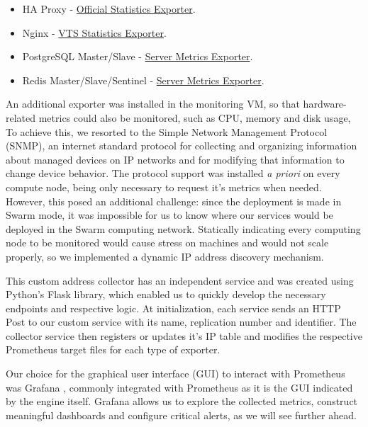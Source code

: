 \documentclass[12pt]{article}
\begin{document}
\vspace{-10pt}
\begin{itemize} [noitemsep]
  \item HA Proxy - \href{https://github.com/prometheus/haproxy_exporter}{Official Statistics Exporter}.
  \item Nginx - \href{https://github.com/hnlq715/nginx-vts-exporter}{VTS Statistics Exporter}.
  \item PostgreSQL Master/Slave - \href{https://github.com/wrouesnel/postgres_exporter}{Server Metrics Exporter}.
  \item Redis Master/Slave/Sentinel - \href{https://github.com/oliver006/redis_exporter}{Server Metrics Exporter}.
\end{itemize}
\vspace{-10pt}

An additional exporter was installed in the monitoring VM, so that hardware-related metrics could also be monitored, such as CPU, memory and disk usage, 
To achieve this, we resorted to the Simple Network Management Protocol (SNMP), an internet standard protocol for collecting and organizing information about 
managed devices on IP networks and for modifying that information to change device behavior. 
The protocol support was installed \textit{a priori} on every compute node, being only necessary to request it's metrics when needed. 
However, this posed an additional challenge: since the deployment is made in Swarm mode, it was impossible for us to know where our services would be deployed 
in the Swarm computing network. 
Statically indicating every computing node to be monitored would cause stress on machines and would not scale properly, so we implemented a dynamic IP address 
discovery mechanism.

This custom address collector has an independent service and was created using Python's Flask library, which enabled us to quickly develop the necessary endpoints 
and respective logic. 
At initialization, each service sends an HTTP Post to our custom service with its name, replication number and identifier. 
The collector service then registers or updates it's IP table and modifies the respective Prometheus target files for each type of exporter.

Our choice for the graphical user interface (GUI) to interact with Prometheus was Grafana \cite{grafana}, commonly integrated with Prometheus as it is the GUI 
indicated by the engine itself. 
Grafana allows us to explore the collected metrics, construct meaningful dashboards and configure critical alerts, as we will see further ahead.
\end{document}
